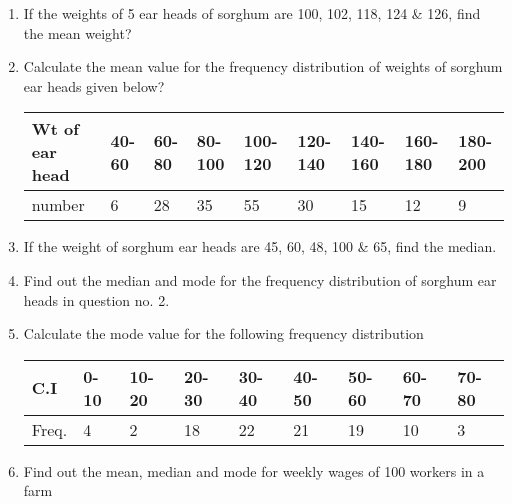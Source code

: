 \documentclass[
]{book}
\begin{document}
\begin{enumerate}
\def\labelenumi{\arabic{enumi}.}
\item
  If the weights of 5 ear heads of sorghum are 100, 102, 118, 124 \& 126, find the mean weight?
\item
  Calculate the mean value for the frequency distribution of weights of sorghum ear heads given below?\\

  \begin{table}[H]
  \centering
  \begin{tabular}[t]{l|l|l|l|l|l|l|l|l}
  \hline
  Wt of ear head & 40-60 & 60-80 & 80-100 & 100-120 & 120-140 & 140-160 & 160-180 & 180-200\\
  \hline
  number & 6 & 28 & 35 & 55 & 30 & 15 & 12 & 9\\
  \hline
  \end{tabular}
  \end{table}
\item
  If the weight of sorghum ear heads are 45, 60, 48, 100 \& 65, find the median.\\
\item
  Find out the median and mode for the frequency distribution of sorghum ear heads in question no. 2.
\item
  Calculate the mode value for the following frequency distribution

  \begin{table}[H]
  \centering
  \begin{tabular}[t]{l|l|l|l|l|l|l|l|l}
  \hline
  C.I & 0-10 & 10-20 & 20-30 & 30-40 & 40-50 & 50-60 & 60-70 & 70-80\\
  \hline
  Freq. & 4 & 2 & 18 & 22 & 21 & 19 & 10 & 3\\
  \hline
  \end{tabular}
  \end{table}
\item
  Find out the mean, median and mode for weekly wages of 100 workers in a farm\\


\end{enumerate}
\end{document}
